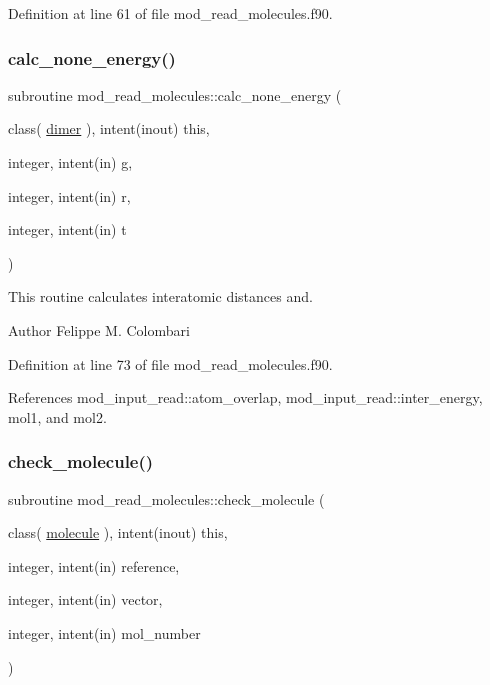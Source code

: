 Definition at line 61 of file mod\+\_\+read\+\_\+molecules.\+f90.

\mbox{\label{namespacemod__read__molecules_a137ae89987a14c217f0bcfba8ca493ec}} 
\subsubsection{\texorpdfstring{calc\+\_\+none\+\_\+energy()}{calc\_none\_energy()}}
{\footnotesize\ttfamily subroutine mod\+\_\+read\+\_\+molecules\+::calc\+\_\+none\+\_\+energy (\begin{DoxyParamCaption}\item[{class( \hyperlink{structmod__read__molecules_1_1dimer}{dimer} ), intent(inout)}]{this,  }\item[{integer, intent(in)}]{g,  }\item[{integer, intent(in)}]{r,  }\item[{integer, intent(in)}]{t }\end{DoxyParamCaption})}



This routine calculates interatomic distances and. 

\begin{DoxyAuthor}{Author}
Felippe M. Colombari 
\end{DoxyAuthor}


Definition at line 73 of file mod\+\_\+read\+\_\+molecules.\+f90.



References mod\+\_\+input\+\_\+read\+::atom\+\_\+overlap, mod\+\_\+input\+\_\+read\+::inter\+\_\+energy, mol1, and mol2.

\mbox{\label{namespacemod__read__molecules_aae2115ec246e295817cd546bda666e23}} 
\subsubsection{\texorpdfstring{check\+\_\+molecule()}{check\_molecule()}}
{\footnotesize\ttfamily subroutine mod\+\_\+read\+\_\+molecules\+::check\+\_\+molecule (\begin{DoxyParamCaption}\item[{class( \hyperlink{structmod__read__molecules_1_1molecule}{molecule} ), intent(inout)}]{this,  }\item[{integer, intent(in)}]{reference,  }\item[{integer, intent(in)}]{vector,  }\item[{integer, intent(in)}]{mol\+\_\+number }\end{DoxyParamCaption})}



